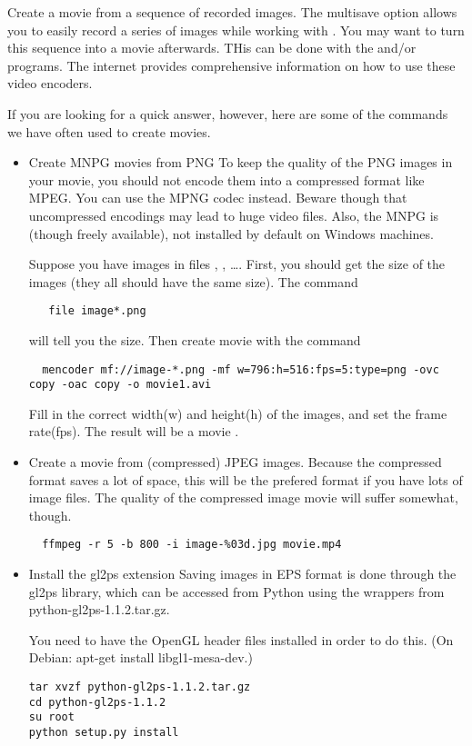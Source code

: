 \begin{description}
\item Create a movie from a sequence of recorded images.
The multisave option allows you to easily record a series of images while working with \pyformex. You may want to turn this sequence into a movie afterwards. THis can be done with the  and/or  programs. The internet provides comprehensive information on how to use these video encoders. 

If you are looking for a quick answer, however, here are some of the commands we have often used to create movies.
\begin{itemize}
\item Create MNPG movies from PNG
To keep the quality of the PNG images in your movie, you should not encode them into a compressed format like MPEG. You can use the MPNG codec instead. Beware though that uncompressed encodings may lead to huge video files. Also, the MNPG is (though freely available), not installed by default on Windows machines.

Suppose you have images in files , , \dots.
First, you should get the size of the images (they all should have the same size). The command 
\begin{verbatim}
   file image*.png
\end{verbatim}
 will tell you the size. Then create movie with the command
\begin{verbatim}
  mencoder mf://image-*.png -mf w=796:h=516:fps=5:type=png -ovc copy -oac copy -o movie1.avi
\end{verbatim}
Fill in the correct width(w) and height(h) of the images, and set the frame rate(fps). The result will be a movie .


\item Create a movie from (compressed) JPEG images.
Because the compressed format saves a lot of space, this will be the prefered format if you have lots of image files. The quality of the compressed image movie will suffer somewhat, though.
\begin{verbatim}
  ffmpeg -r 5 -b 800 -i image-%03d.jpg movie.mp4
\end{verbatim}


\item Install the gl2ps extension
Saving images in EPS format is done through the gl2ps library, which can be accessed from Python using the wrappers from python-gl2ps-1.1.2.tar.gz.

You need to have the OpenGL header files installed in order to do this. (On Debian: apt-get install libgl1-mesa-dev.)

\begin{verbatim}
tar xvzf python-gl2ps-1.1.2.tar.gz
cd python-gl2ps-1.1.2
su root
python setup.py install
\end{verbatim}

\end{itemize}
\end{description}


